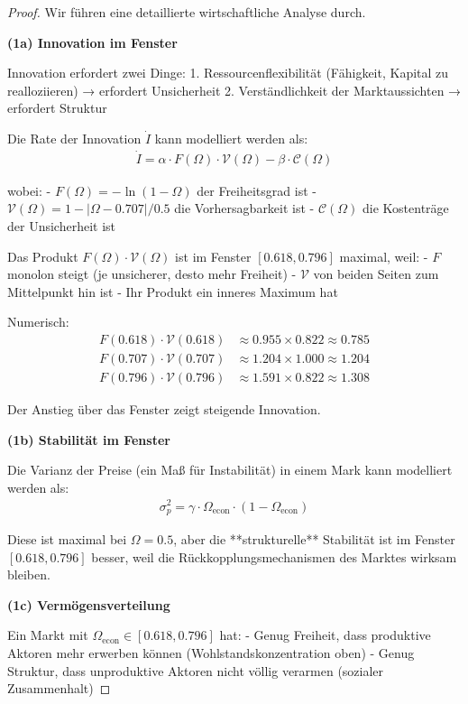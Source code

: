 \documentclass[a4paper,12pt,twoside]{report}
\theoremstyle{definition}
\begin{document}
\begin{proof}

Wir führen eine detaillierte wirtschaftliche Analyse durch.

\textbf{(1a) Innovation im Fenster}

Innovation erfordert zwei Dinge:
1. Ressourcenflexibilität (Fähigkeit, Kapital zu realloziieren) → erfordert Unsicherheit
2. Verständlichkeit der Marktaussichten → erfordert Struktur

Die Rate der Innovation $\dot{I}$ kann modelliert werden als:
\begin{align}
\dot{I} = \alpha \cdot F(\Omega) \cdot \mathcal{V}(\Omega) - \beta \cdot \mathcal{C}(\Omega)
\end{align}

wobei:
- $F(\Omega) = -\ln(1-\Omega)$ der Freiheitsgrad ist
- $\mathcal{V}(\Omega) = 1 - |\Omega - 0.707|/0.5$ die Vorhersagbarkeit ist
- $\mathcal{C}(\Omega)$ die Kostenträge der Unsicherheit ist

Das Produkt $F(\Omega) \cdot \mathcal{V}(\Omega)$ ist im Fenster $[0.618, 0.796]$ maximal, weil:
- $F$ monolon steigt (je unsicherer, desto mehr Freiheit)
- $\mathcal{V}$ von beiden Seiten zum Mittelpunkt hin ist
- Ihr Produkt ein inneres Maximum hat

Numerisch:
\begin{align}
F(0.618) \cdot \mathcal{V}(0.618) &\approx 0.955 \times 0.822 \approx 0.785 \\
F(0.707) \cdot \mathcal{V}(0.707) &\approx 1.204 \times 1.000 \approx 1.204 \\
F(0.796) \cdot \mathcal{V}(0.796) &\approx 1.591 \times 0.822 \approx 1.308
\end{align}

Der Anstieg über das Fenster zeigt steigende Innovation.

\textbf{(1b) Stabilität im Fenster}

Die Varianz der Preise (ein Maß für Instabilität) in einem Mark kann modelliert werden als:
\begin{align}
\sigma_p^2 = \gamma \cdot \Omega_{\text{econ}} \cdot (1 - \Omega_{\text{econ}})
\end{align}

Diese ist maximal bei $\Omega = 0.5$, aber die **strukturelle** Stabilität ist im Fenster $[0.618, 0.796]$ besser, weil die Rückkopplungsmechanismen des Marktes wirksam bleiben.

\textbf{(1c) Vermögensverteilung}

Ein Markt mit $\Omega_{\text{econ}} \in [0.618, 0.796]$ hat:
- Genug Freiheit, dass produktive Aktoren mehr erwerben können (Wohlstandskonzentration oben)
- Genug Struktur, dass unproduktive Aktoren nicht völlig verarmen (sozialer Zusammenhalt)


\end{proof}
\end{document}
